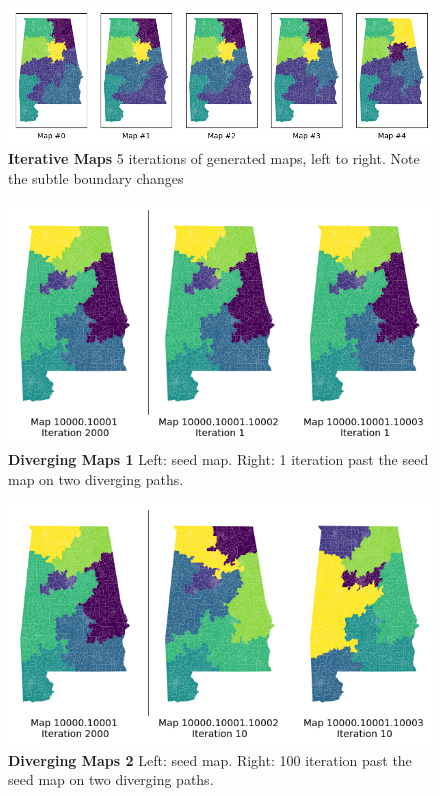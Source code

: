 \documentclass{article}
\begin{document}
\begin{figure}[h]\label{iterative maps}
    \centering
    \includegraphics[scale=.7]{images/changing_maps.png}
    \caption{\textbf{Iterative Maps} 5 iterations of generated maps, left to right. Note the subtle boundary changes}
\end{figure}

\begin{figure}[h]\label{diverge 1}
    \centering
    \includegraphics[scale=.7]{images/maps_1.png}
    \caption{\textbf{Diverging Maps 1} 
    Left: seed map. Right: 1 iteration past the seed map on two diverging paths.}
\end{figure}

\begin{figure}[h]\label{diverge 10}
    \centering
    \includegraphics[scale=.7]{images/maps_10.png}
    \caption{\textbf{Diverging Maps 2} Left: seed map. Right: 100 iteration past the seed map on two diverging paths.}
\end{figure}
\end{document}
